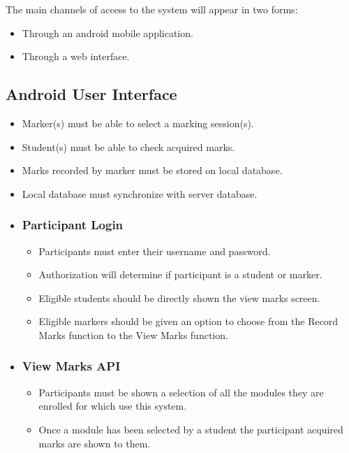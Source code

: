 \documentclass[10pt,a4paper]{article}
\begin{document}
The main channels of access to the system will appear in two forms:
\begin{itemize}
\item Through an android mobile application.
\item Through a web interface.
\end{itemize}
	
	\subsection*{Android User Interface}
	\begin{itemize}
		\item Marker(s) must be able to select a marking session(s).
		\item Student(s) must be able to check acquired marks.
		\item Marks recorded by marker must be stored on local database.
		\item Local database must synchronize with server database.
	
		\item \subsubsection*{Participant Login}
		\begin{itemize}
			\item Participants must enter their username and password.
			\item Authorization will determine if participant is a student or marker. 
			\item Eligible students should be directly shown the view marks screen.
			\item Eligible markers should be given an option to choose from the Record Marks function to the View Marks function.
		\end{itemize}
		
		
		\item \subsubsection*{View Marks API}
		\begin{itemize}
			\item Participants must be shown a selection of all the modules they are enrolled for which use this system. 
			\item Once a module has been selected by a student the participant acquired marks are shown to them.
		\end{itemize}
		

\end{itemize}
\end{document}
